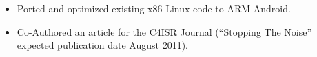 \documentclass[margin,line]{resume}
\begin{document}
\begin{resume}
\begin{itemize}
    \item Ported and optimized existing x86 Linux code to ARM Android.
    \item Co-Authored an article for the C4ISR Journal (``Stopping The Noise'' expected publication
          date August 2011).
\end{itemize}


\end{resume}
\end{document}
